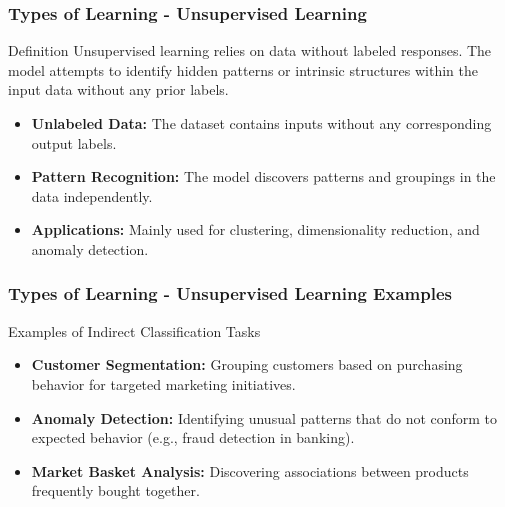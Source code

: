 \documentclass[aspectratio=169]{beamer}
\begin{document}
\begin{frame}[fragile]
    \frametitle{Types of Learning - Unsupervised Learning}
    \begin{block}{Definition}
        Unsupervised learning relies on data without labeled responses. The model attempts to identify hidden patterns or intrinsic structures within the input data without any prior labels.
    \end{block}
    \begin{itemize}
        \item \textbf{Unlabeled Data:} The dataset contains inputs without any corresponding output labels.
        \item \textbf{Pattern Recognition:} The model discovers patterns and groupings in the data independently.
        \item \textbf{Applications:} Mainly used for clustering, dimensionality reduction, and anomaly detection.
    \end{itemize}
\end{frame}

\begin{frame}[fragile]
    \frametitle{Types of Learning - Unsupervised Learning Examples}
    \begin{block}{Examples of Indirect Classification Tasks}
        \begin{itemize}
            \item \textbf{Customer Segmentation:} Grouping customers based on purchasing behavior for targeted marketing initiatives.
            \item \textbf{Anomaly Detection:} Identifying unusual patterns that do not conform to expected behavior (e.g., fraud detection in banking).
            \item \textbf{Market Basket Analysis:} Discovering associations between products frequently bought together.
        \end{itemize}
    \end{block}
\end{frame}
\end{document}
